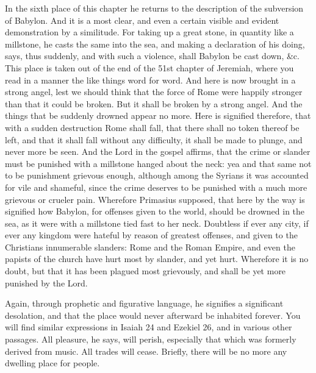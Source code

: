 In the sixth place of this chapter he returns to the description of the subversion of Babylon. And it is a most clear, and even a certain visible and evident demonstration by a similitude. For taking up a great stone, in quantity like a millstone, he casts the same into the sea, and making a declaration of his doing, says, thus suddenly, and with such a violence, shall Babylon be cast down, \&c. This place is taken out of the end of the 51st chapter of Jeremiah, where you read in a manner the like things word for word. And here is now brought in a strong angel, lest we should think that the force of Rome were happily stronger than that it could be broken. But it shall be broken by a strong angel. And the things that be suddenly drowned appear no more. Here is signified therefore, that with a sudden destruction Rome shall fall, that there shall no token thereof be left, and that it shall fall without any difficulty, it shall be made to plunge, and never more be seen. And the Lord in the gospel affirms, that the crime or slander must be punished with a millstone hanged about the neck: yea and that same not to be punishment grievous enough, although among the Syrians it was accounted for vile and shameful, since the crime deserves to be punished with a much more grievous or crueler pain. Wherefore Primasius supposed, that here by the way is signified how Babylon, for offenses given to the world, should be drowned in the sea, as it were with a millstone tied fast to her neck. Doubtless if ever any city, if ever any kingdom were hateful by reason of greatest offenses, and given to the Christians innumerable slanders: Rome and the Roman Empire, and even the papists of the church have hurt most by slander, and yet hurt. Wherefore it is no doubt, but that it has been plagued most grievously, and shall be yet more punished by the Lord.

Again, through prophetic and figurative language, he signifies a significant desolation, and that the place would never afterward be inhabited forever. You will find similar expressions in Isaiah 24 and Ezekiel 26, and in various other passages. All pleasure, he says, will perish, especially that which was formerly derived from music. All trades will cease. Briefly, there will be no more any dwelling place for people.

